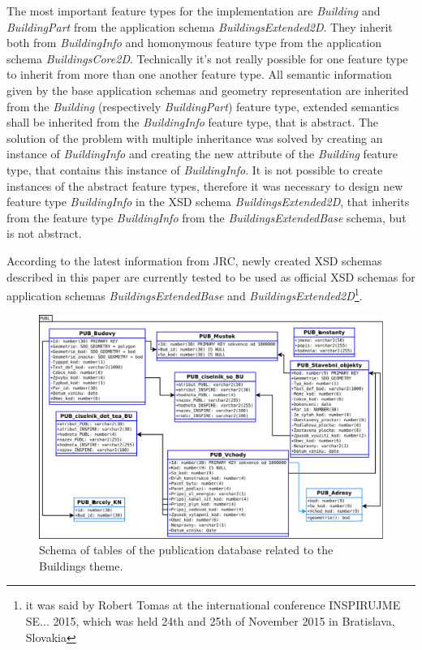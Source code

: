 \documentclass[eprint]{actapoly}
\begin{document}
The most important feature types for the implementation are \textit{Building }and \textit{BuildingPart }from the application schema \textit{BuildingsExtended2D}. They inherit both from \textit{BuildingInfo} and homonymous feature type from the application schema \textit{BuildingsCore2D}. Technically it's not really possible for one feature type to inherit from more than one another feature type. All semantic information given by the base application schemas and geometry representation are inherited from the \textit{Building} (respectively \textit{BuildingPart}) feature type, extended semantics shall be inherited from the \textit{BuildingInfo} feature type, that is abstract. The solution of the problem with multiple inheritance was solved by creating an instance of \textit{BuildingInfo} and creating the new attribute of the \textit{Building }feature type, that contains this instance of \textit{BuildingInfo}. It is not possible to create instances of the abstract feature types,  therefore it was necessary to design new feature type \textit{BuildingInfo} in the XSD schema \textit{BuildingsExtended2D}, that inherits from the feature type \textit{BuildingInfo} from the \textit{BuildingsExtendedBase} schema, but is not abstract. 

According to the latest information from JRC, newly created XSD schemas described in this paper are currently tested to be used as official XSD schemas for application schemas \textit{BuildingsExtendedBase} and \textit{BuildingsExtended2D}\footnote{it was said by Robert Tomas at the international conference INSPIRUJME SE... 2015, which was held 24th and 25th of November 2015 in Bratislava, Slovakia}. 

\begin{figure}
\centering
\includegraphics[width=0.8\linewidth]{pics/BU_PUBL_DB.pdf} %
\caption{Schema of tables of the publication database related to the Buildings theme.}
\label{fig:publication_db}
\end{figure}
\end{document}
